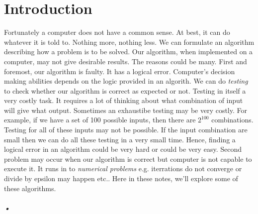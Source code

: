 \chapter{Introduction}
\label{chap1:introduction}
Fortunately a computer does not have a common sense. At best, it can do whatever it is told to. Nothing more, nothing less. We can formulate an algorithm describing how a problem is to be solved. Our algorithm, when implemented on a computer, may not give desirable results. The reasons could be many. First and foremost, our algorithm is faulty. It has a logical error. Computer's decision making abilities depends on the logic provided in an algorith. We can do \textit{testing} to check whether our algorithm is correct as expected or not. Testing in itself a very costly task. It requires a lot of thinking about what combination of input will give what output. Sometimes an exhaustibe testing may be very costly. For example, if we have a set of 100 possible inputs, then there are $2^100$ combinations. Testing for all of these inputs may not be possible. If the input combination are small then we can do all these testing in a very small time. Hence, finding a logical error in an algorithm could be very hard or could be very easy. Second problem may occur when our algorithm is correct but computer is not capable to execute it. It runs in to \textit{numerical problems} e.g. iterrations do not converge or divide by epsilon may happen etc.. Here in these notes, we'll explore some of these algorithms. 
\paragraph*{•}


 
